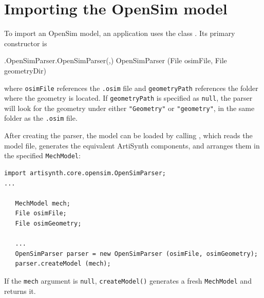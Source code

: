 \section{Importing the OpenSim model}
\label{OpenSimParser} 

To import an OpenSim model, an application uses the class
. Its primary constructor is
%
\begin{methodtable}{0.5}{0.5}
%
\methodentry
{\osim.OpenSimParser.OpenSimParser(,)}%
{OpenSimParser (File osimFile, File geometryDir)}%
{\ }%
%
\end{methodtable}
%
where {\tt osimFile} references the {\tt .osim} file and {\tt geometryPath}
references the folder where the geometry is located. If {\tt geometryPath} is
specified as {\tt null}, the parser will look for the geometry under either
{\tt "Geometry"} or {\tt "geometry"}, in the same folder as the {\tt .osim}
file.

After creating the parser, the model can be loaded by calling
,
which reads the model file, generates the equivalent ArtiSynth components,
and arranges them in the specified {\tt MechModel}:
%
\begin{lstlisting}[]
import artisynth.core.opensim.OpenSimParser;
...

   MechModel mech;
   File osimFile;
   File osimGeometry;

   ...
   OpenSimParser parser = new OpenSimParser (osimFile, osimGeometry);
   parser.createModel (mech);
\end{lstlisting}
%
If the {\tt mech} argument is {\tt null}, {\tt createModel()} generates a fresh
{\tt MechModel} and returns it.

